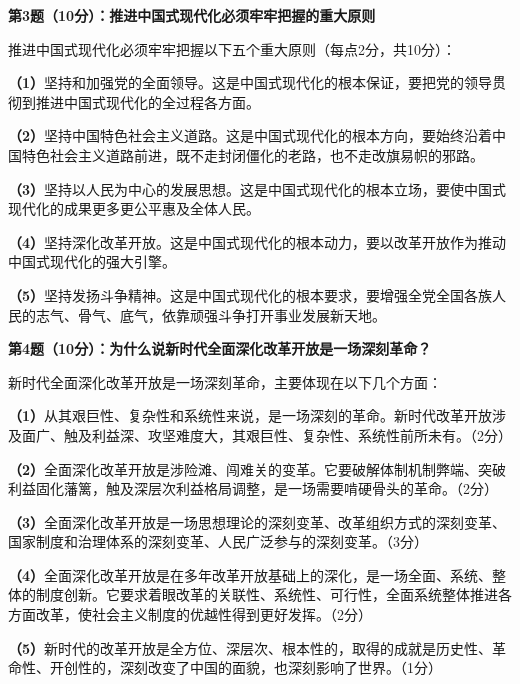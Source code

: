 \documentclass[12pt, a4paper]{article}
\begin{document}
\begin{answerbox}

\textbf{第3题（10分）：推进中国式现代化必须牢牢把握的重大原则}

推进中国式现代化必须牢牢把握以下五个重大原则（每点2分，共10分）：

\textbf{（1）}坚持和加强党的全面领导。这是中国式现代化的根本保证，要把党的领导贯彻到推进中国式现代化的全过程各方面。

\textbf{（2）}坚持中国特色社会主义道路。这是中国式现代化的根本方向，要始终沿着中国特色社会主义道路前进，既不走封闭僵化的老路，也不走改旗易帜的邪路。

\textbf{（3）}坚持以人民为中心的发展思想。这是中国式现代化的根本立场，要使中国式现代化的成果更多更公平惠及全体人民。

\textbf{（4）}坚持深化改革开放。这是中国式现代化的根本动力，要以改革开放作为推动中国式现代化的强大引擎。

\textbf{（5）}坚持发扬斗争精神。这是中国式现代化的根本要求，要增强全党全国各族人民的志气、骨气、底气，依靠顽强斗争打开事业发展新天地。

\end{answerbox}

\begin{answerbox}

\textbf{第4题（10分）：为什么说新时代全面深化改革开放是一场深刻革命？}

新时代全面深化改革开放是一场深刻革命，主要体现在以下几个方面：

\textbf{（1）}从其艰巨性、复杂性和系统性来说，是一场深刻的革命。新时代改革开放涉及面广、触及利益深、攻坚难度大，其艰巨性、复杂性、系统性前所未有。（2分）

\textbf{（2）}全面深化改革开放是涉险滩、闯难关的变革。它要破解体制机制弊端、突破利益固化藩篱，触及深层次利益格局调整，是一场需要啃硬骨头的革命。（2分）

\textbf{（3）}全面深化改革开放是一场思想理论的深刻变革、改革组织方式的深刻变革、国家制度和治理体系的深刻变革、人民广泛参与的深刻变革。（3分）

\textbf{（4）}全面深化改革开放是在多年改革开放基础上的深化，是一场全面、系统、整体的制度创新。它要求着眼改革的关联性、系统性、可行性，全面系统整体推进各方面改革，使社会主义制度的优越性得到更好发挥。（2分）

\textbf{（5）}新时代的改革开放是全方位、深层次、根本性的，取得的成就是历史性、革命性、开创性的，深刻改变了中国的面貌，也深刻影响了世界。（1分）

\end{answerbox}
\end{document}
